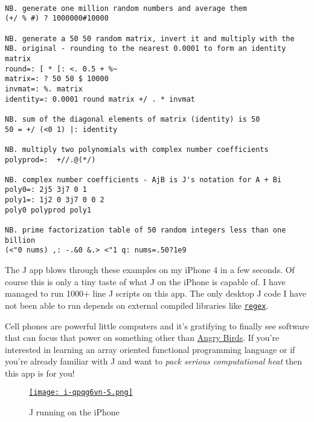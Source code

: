 \begin{tcolorbox}[breakable, size=fbox, boxrule=1pt, pad at break*=1mm,colback=cellbackground, colframe=cellborder]
\begin{lstlisting}[language=jdoc, frame=single,framerule=0pt,label=lst:scr3026X0]

NB. generate one million random numbers and average them
(+/ % #) ? 1000000#10000
   
NB. generate a 50 50 random matrix, invert it and multiply with the 
NB. original - rounding to the nearest 0.0001 to form an identity matrix 
round=: [ * [: <. 0.5 + %~
matrix=: ? 50 50 $ 10000
invmat=: %. matrix
identity=: 0.0001 round matrix +/ . * invmat
   
NB. sum of the diagonal elements of matrix (identity) is 50 
50 = +/ (<0 1) |: identity
   
NB. multiply two polynomials with complex number coefficients
polyprod=:  +//.@(*/) 

NB. complex number coefficients - AjB is J's notation for A + Bi
poly0=: 2j5 3j7 0 1
poly1=: 1j2 0 3j7 0 0 2
poly0 polyprod poly1

NB. prime factorization table of 50 random integers less than one billion
(<"0 nums) ,: -.&0 &.> <"1 q: nums=.50?1e9
\end{lstlisting}
\end{tcolorbox}

The J app blows through these examples on my iPhone 4 in a few seconds.
Of course this is only a tiny taste of what J on the iPhone is capable
of. I have managed to run 1000+ line J scripts on this app. The only
desktop J code I have not been able to run depends on external compiled
libraries like
\href{http://www.jsoftware.com/help/user/script\_regex.htm}{\texttt{regex}}.

Cell phones are powerful little computers and it's gratifying to finally
see software that can focus that power on something other than
\href{http://itunes.apple.com/us/app/angry-birds/id343200656?mt=8}{Angry
Birds}. If you're interested in learning an array oriented functional
programming language or if you're already familiar with J and want to
\emph{pack serious computational heat} then this app is for you!

\begin{figure}[htbp]
\centering
\href{http://www.jsoftware.com/}{\texttt{[image: i-qpqg6vn-S.png]}}
\caption{J running on the iPhone}
\label{fig:3026X1}
\end{figure}


